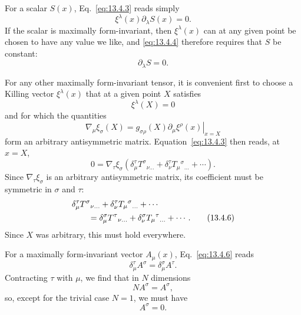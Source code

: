 For a scalar \(S(x)\), Eq.~\eqref{eq:13.4.3} reads simply
\begin{equation}
  \xi^\lambda(x)\partial_\lambda S(x)=0.
  \tag{13.4.4}\label{eq:13.4.4}
\end{equation}
If the scalar is maximally form-invariant, then \(\xi^\lambda(x)\) can at
any given point be chosen to have any value we like, and
\eqref{eq:13.4.4} therefore requires that \(S\) be constant:
\begin{equation}
  \partial_\lambda S=0.
  \tag{13.4.5}\label{eq:13.4.5}
\end{equation}

For any other maximally form-invariant tensor, it is convenient first to
choose a Killing vector \(\xi^\lambda(x)\) that at a given point \(X\)
satisfies
\[
  \xi^\lambda(X)=0
\]
and for which the quantities
\[
  \nabla_\mu\xi_\sigma(X)
  =
  g_{\sigma\rho}(X)
  \left.\partial_\mu\xi^\rho(x)\right|_{x=X}
\]
form an arbitrary antisymmetric matrix. Equation~\eqref{eq:13.4.3} then
reads, at \(x=X\),
\[
  0
  =
  \nabla_\tau\xi_\sigma
  \left(
    \delta_\mu^\tau T^\sigma{}_{\nu\ldots}
    +\delta_\nu^\tau T_\mu{}^\sigma{}_{\ldots}
    +\cdots
  \right).
\]
Since \(\nabla_\tau\xi_\sigma\) is an arbitrary antisymmetric matrix, its
coefficient must be symmetric in \(\sigma\) and \(\tau\):
\begin{align}
  &\delta_\mu^\tau T^\sigma{}_{\nu\ldots}
  +\delta_\nu^\tau T_\mu{}^\sigma{}_{\ldots}
  +\cdots
  \notag\\
  &\qquad =
  \delta_\mu^\sigma T^\tau{}_{\nu\ldots}
  +\delta_\nu^\sigma T_\mu{}^\tau{}_{\ldots}
  +\cdots.
  \tag{13.4.6}\label{eq:13.4.6}
\end{align}
Since \(X\) was arbitrary, this must hold everywhere.

For a maximally form-invariant vector \(A_\mu(x)\),
Eq.~\eqref{eq:13.4.6} reads
\[
  \delta_\mu^\tau A^\sigma
  =
  \delta_\mu^\sigma A^\tau.
\]
Contracting \(\tau\) with \(\mu\), we find that in \(N\) dimensions
\[
  NA^\sigma=A^\sigma,
\]
so, except for the trivial case \(N=1\), we must have
\begin{equation}
  A^\sigma=0.
  \tag{13.4.7}\label{eq:13.4.7}
\end{equation}

